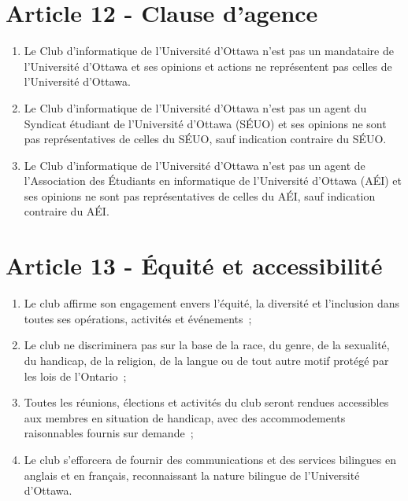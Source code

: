 \section*{Article 12 - Clause d'agence}

\begin{enumerate}
    \item Le Club d'informatique de l'Université d'Ottawa n'est pas un mandataire de
          l'Université d'Ottawa et ses opinions et actions ne représentent pas celles
          de l'Université d'Ottawa.

      \item Le Club d'informatique de l'Université d'Ottawa n’est pas un agent
          du Syndicat étudiant de l’Université d’Ottawa (SÉUO) et ses opinions
          ne sont pas représentatives de celles du SÉUO, sauf indication
          contraire du SÉUO.

      \item Le Club d'informatique de l'Université d'Ottawa n’est pas un agent
          de l'Association des Étudiants en informatique de l’Université
          d’Ottawa (AÉI) et ses opinions ne sont pas représentatives de celles
          du AÉI, sauf indication contraire du AÉI.

\end{enumerate}


\section*{Article 13 - Équité et accessibilité}
\begin{enumerate}
    \item Le club affirme son engagement envers l'équité, la diversité et l'inclusion dans toutes ses opérations, activités et événements~;
    \item Le club ne discriminera pas sur la base de la race, du genre, de la sexualité, du handicap, de la religion, de la langue ou de tout autre motif protégé par les lois de l'Ontario~;
    \item Toutes les réunions, élections et activités du club seront rendues accessibles aux membres en situation de handicap, avec des accommodements raisonnables fournis sur demande~;
    \item Le club s'efforcera de fournir des communications et des services bilingues en anglais et en français, reconnaissant la nature bilingue de l'Université d'Ottawa.
\end{enumerate}
